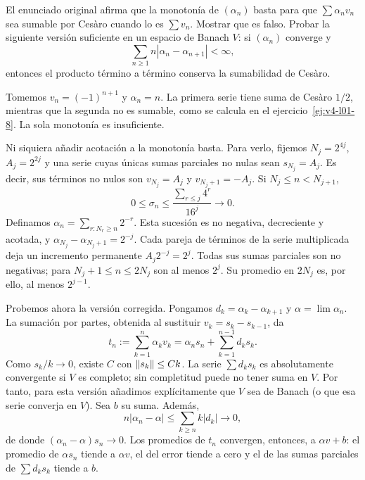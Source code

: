 \begin{ejercicio}\label{ej:v4-l01-2}
El enunciado original afirma que la monotonía de $(\alpha_n)$ basta para que $\sum\alpha_nv_n$ sea sumable por Cesàro cuando lo es $\sum v_n$. Mostrar que es falso. Probar la siguiente versión suficiente en un espacio de Banach $V$: si $(\alpha_n)$ converge y
\[
 \sum_{n\geq1} n|\alpha_n-\alpha_{n+1}|<\infty,
\]
entonces el producto término a término conserva la sumabilidad de Cesàro.
\end{ejercicio}
\begin{solucion}
Tomemos $v_n=(-1)^{n+1}$ y $\alpha_n=n$. La primera serie tiene suma de Cesàro $1/2$, mientras que la segunda no es sumable, como se calcula en el ejercicio~\ref{ej:v4-l01-8}. La sola monotonía es insuficiente.

Ni siquiera añadir acotación a la monotonía basta. Para verlo, fijemos $N_j=2^{4j}$, $A_j=2^{2j}$ y una serie cuyas únicas sumas parciales no nulas sean $s_{N_j}=A_j$. Es decir, sus términos no nulos son $v_{N_j}=A_j$ y $v_{N_j+1}=-A_j$. Si $N_j\leq n<N_{j+1}$,
\[
 0\leq\sigma_n\leq\frac{\sum_{r\leq j}4^r}{16^j}\longrightarrow0.
\]
Definamos $\alpha_n=\sum_{r:N_r\geq n}2^{-r}$. Esta sucesión es no negativa, decreciente y acotada, y $\alpha_{N_j}-\alpha_{N_j+1}=2^{-j}$. Cada pareja de términos de la serie multiplicada deja un incremento permanente $A_j2^{-j}=2^j$. Todas sus sumas parciales son no negativas; para $N_j+1\leq n\leq2N_j$ son al menos $2^j$. Su promedio en $2N_j$ es, por ello, al menos $2^{j-1}$.

Probemos ahora la versión corregida. Pongamos $d_k=\alpha_k-\alpha_{k+1}$ y $\alpha=\lim\alpha_n$. La sumación por partes, obtenida al sustituir $v_k=s_k-s_{k-1}$, da
\[
 t_n:=\sum_{k=1}^n\alpha_kv_k=\alpha_ns_n+\sum_{k=1}^{n-1}d_ks_k.
\]
Como $s_k/k\to0$, existe $C$ con $\left\lVert s_k\right\rVert\leq Ck$. La serie $\sum d_ks_k$ es absolutamente convergente si $V$ es completo; sin completitud puede no tener suma en $V$. Por tanto, para esta versión añadimos explícitamente que $V$ sea de Banach (o que esa serie converja en $V$). Sea $b$ su suma. Además,
\[
 n|\alpha_n-\alpha|\leq\sum_{k\geq n}k|d_k|\longrightarrow0,
\]
de donde $(\alpha_n-\alpha)s_n\to0$. Los promedios de $t_n$ convergen, entonces, a $\alpha v+b$: el promedio de $\alpha s_n$ tiende a $\alpha v$, el del error tiende a cero y el de las sumas parciales de $\sum d_ks_k$ tiende a $b$.
\end{solucion}

